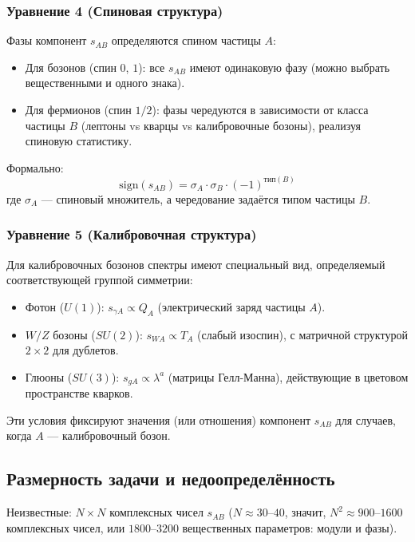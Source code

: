\documentclass[12pt,a4paper]{article}
\begin{document}
\subsubsection{Уравнение 4 (Спиновая структура)}
Фазы компонент $s_{AB}$ определяются спином частицы $A$:

\begin{itemize}
    \item Для бозонов (спин $0$, $1$): все $s_{AB}$ имеют одинаковую фазу (можно выбрать вещественными и одного знака).
    \item Для фермионов (спин $1/2$): фазы чередуются в зависимости от класса частицы $B$ (лептоны vs кварцы vs калибровочные бозоны), реализуя спиновую статистику.
\end{itemize}

Формально:
\begin{equation}
    \text{sign}(s_{AB}) = \sigma_A \cdot \sigma_B \cdot (-1)^{\text{тип}(B)}
\end{equation}
где $\sigma_A$ --- спиновый множитель, а чередование задаётся типом частицы $B$.

\subsubsection{Уравнение 5 (Калибровочная структура)}
Для калибровочных бозонов спектры имеют специальный вид, определяемый соответствующей группой симметрии:

\begin{itemize}
    \item Фотон ($U(1)$): $s_{\gamma A} \propto Q_A$ (электрический заряд частицы $A$).
    \item $W/Z$ бозоны ($SU(2)$): $s_{WA} \propto T_A$ (слабый изоспин), с матричной структурой $2 \times 2$ для дублетов.
    \item Глюоны ($SU(3)$): $s_{gA} \propto \lambda^a$ (матрицы Гелл-Манна), действующие в цветовом пространстве кварков.
\end{itemize}

Эти условия фиксируют значения (или отношения) компонент $s_{AB}$ для случаев, когда $A$ --- калибровочный бозон.

\subsection{Размерность задачи и недоопределённость}

Неизвестные: $N \times N$ комплексных чисел $s_{AB}$ ($N \approx 30$--$40$, значит, $N^2 \approx 900$--$1600$ комплексных чисел, или $1800$--$3200$ вещественных параметров: модули и фазы).
\end{document}
